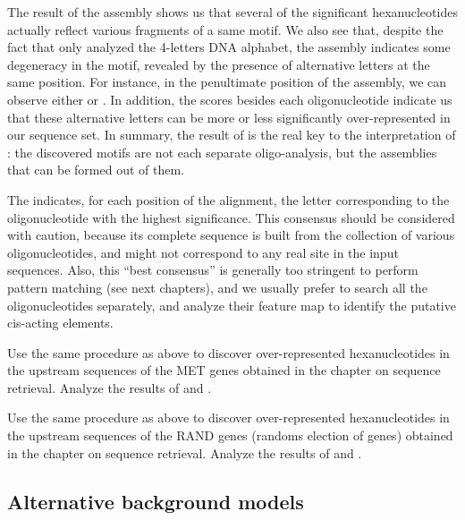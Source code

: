 The result of the assembly shows us that several of the significant
hexanucleotides actually reflect various fragments of a same motif.  We
also see that, despite the fact that  only
analyzed the 4-letters DNA alphabet, the assembly indicates some
degeneracy in the motif, revealed by the presence of alternative
letters at the same position. For instance, in the penultimate
position of the assembly, we can observe either  or . In
addition, the scores besides each oligonucleotide indicate us that
these alternative letters can be more or less significantly
over-represented in our sequence set. In summary, the result of
 is the real key to the interpretation of
: the discovered motifs are not each separate
oligo-analysis, but the assemblies that can be formed out of them.

The  indicates, for each position of the
alignment, the letter corresponding to the oligonucleotide with the
highest significance. This consensus should be considered with
caution, because its complete sequence is built from the collection of
various oligonucleotides, and might not correspond to any real site in
the input sequences. Also, this ``best consensus'' is generally too
stringent to perform pattern matching (see next chapters), and we
usually prefer to search all the oligonucleotides separately, and
analyze their feature map to identify the putative cis-acting
elements.

\begin{exercise}
  Use the same procedure as above to discover over-represented
  hexanucleotides in the upstream sequences of the MET genes obtained
  in the chapter on sequence retrieval. Analyze the results of
   and .
\end{exercise}


\begin{exercise}
  Use the same procedure as above to discover over-represented
  hexanucleotides in the upstream sequences of the RAND genes (randoms
  election of genes) obtained in the chapter on sequence
  retrieval. Analyze the results of  and
  .
\end{exercise}


\subsection{Alternative background models}

